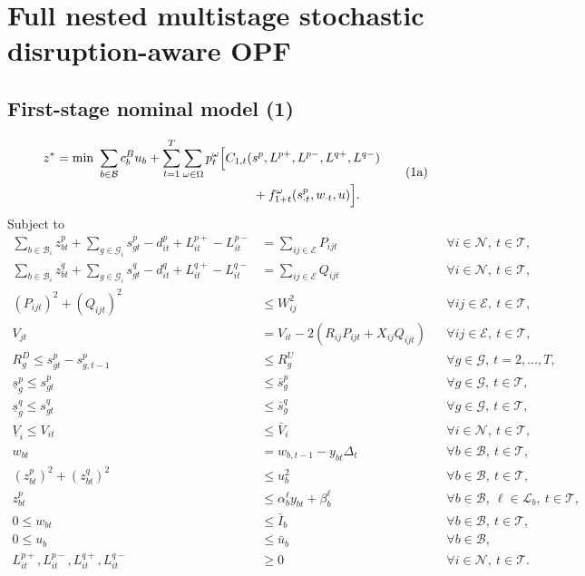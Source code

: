 \documentclass[10pt]{article}
\begin{document}
\section*{Full nested multistage stochastic disruption-aware OPF}
\subsection*{First-stage nominal model (1)}
\begin{equation}
\begin{aligned}
z^*=\min\ &\sum_{b\in\mathcal B}c_b^B u_b+\sum_{t=1}^{T}\sum_{\omega\in\Omega}p_t^\omega\Bigl[C_{1,t}(s^p,L^{p+},L^{p-},L^{q+},L^{q-})\\
&\hspace{43mm}+f_{1+t}^\omega(s_{\cdot t}^p,w_{\cdot t},u)\Bigr].
\end{aligned}\tag{1a}
\end{equation}
Subject to
\begin{align}
\sum_{b\in\mathcal B_i}z_{bt}^p+\sum_{g\in\mathcal G_i}s_{gt}^p-d_{it}^p+L_{it}^{p+}-L_{it}^{p-}&=\sum_{ij\in\mathcal E}P_{ijt} &&\forall i\in\mathcal N,\ t\in\mathcal T, \tag{1b}\\
\sum_{b\in\mathcal B_i}z_{bt}^q+\sum_{g\in\mathcal G_i}s_{gt}^q-d_{it}^q+L_{it}^{q+}-L_{it}^{q-}&=\sum_{ij\in\mathcal E}Q_{ijt} &&\forall i\in\mathcal N,\ t\in\mathcal T, \tag{1c}\\
(P_{ijt})^2+(Q_{ijt})^2&\leq W_{ij}^2 &&\forall ij\in\mathcal E,\ t\in\mathcal T, \tag{1d}\\
V_{jt}&=V_{it}-2(R_{ij}P_{ijt}+X_{ij}Q_{ijt}) &&\forall ij\in\mathcal E,\ t\in\mathcal T, \tag{1e}\\
R_g^D\leq s_{gt}^p-s_{g,t-1}^p&\leq R_g^U &&\forall g\in\mathcal G,\ t=2,\ldots,T, \tag{1f}\\
\underline{s}_g^p\leq s_{gt}^p&\leq\bar{s}_g^p &&\forall g\in\mathcal G,\ t\in\mathcal T, \tag{1g}\\
\underline{s}_g^q\leq s_{gt}^q&\leq\bar{s}_g^q &&\forall g\in\mathcal G,\ t\in\mathcal T, \tag{1h}\\
\underline V_i\leq V_{it}&\leq\bar V_i &&\forall i\in\mathcal N,\ t\in\mathcal T, \tag{1i}\\
w_{bt}&=w_{b,t-1}-y_{bt}\Delta_t &&\forall b\in\mathcal B,\ t\in\mathcal T, \tag{1j}\\
(z_{bt}^p)^2+(z_{bt}^q)^2&\leq u_b^2 &&\forall b\in\mathcal B,\ t\in\mathcal T, \tag{1k}\\
z_{bt}^p&\leq\alpha_b^\ell y_{bt}+\beta_b^\ell &&\forall b\in\mathcal B,\ \ell\in\mathcal L_b,\ t\in\mathcal T, \tag{1l}\\
0\leq w_{bt}&\leq\bar I_b &&\forall b\in\mathcal B,\ t\in\mathcal T, \tag{1m}\\
0\leq u_b&\leq\bar u_b &&\forall b\in\mathcal B, \tag{1n}\\
L_{it}^{p+},L_{it}^{p-},L_{it}^{q+},L_{it}^{q-}&\geq0 &&\forall i\in\mathcal N,\ t\in\mathcal T. \tag{1o}
\end{align}
\end{document}
